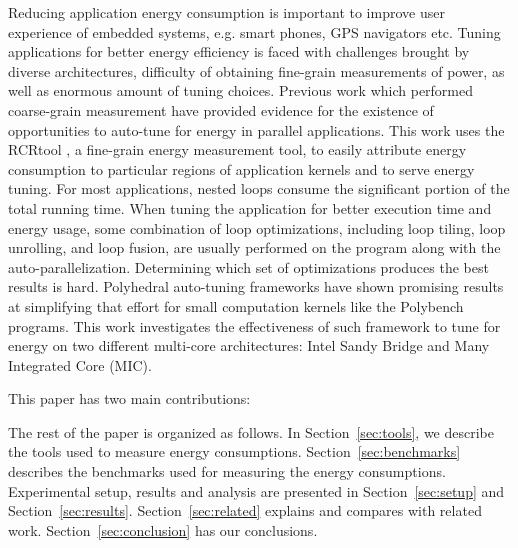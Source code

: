 Reducing application energy consumption is important to improve user experience of 
embedded systems, e.g. smart phones, GPS navigators etc. 
Tuning applications for better energy efficiency is faced with challenges brought by
diverse architectures, difficulty of obtaining fine-grain measurements of power, 
as well as enormous amount of tuning choices.
Previous work which performed coarse-grain measurement have provided evidence for the 
existence of opportunities to auto-tune for energy in parallel applications\cite{Tiwari:EnergyAutoTune}.
This work uses the RCRtool \cite{us}, a fine-grain energy measurement tool, to easily attribute energy consumption to particular
regions of application kernels and to serve energy tuning. For most applications, nested loops consume the significant 
portion of the total running time. When tuning the application for
better execution time and energy usage, some combination of loop optimizations, including loop 
tiling, loop unrolling, and loop fusion, are usually performed on the 
program along with the auto-parallelization.
Determining which set of optimizations produces the best results is hard.
Polyhedral auto-tuning frameworks have shown promising results at simplifying that effort\cite{EJ2012}
for small computation kernels like the Polybench programs. 
This work investigates the effectiveness of such framework to tune for 
energy on two different multi-core architectures: Intel Sandy Bridge
and Many Integrated Core (MIC).
 
This paper has two main contributions:  

The rest of the paper is organized as follows. In Section~\ref{sec:tools}, we describe the tools
used to measure energy consumptions. Section~\ref{sec:benchmarks} describes the benchmarks used for  
measuring the energy consumptions. Experimental setup, results and analysis are presented in Section~\ref{sec:setup} and Section~\ref{sec:results}. 
Section~\ref{sec:related} explains and compares with related work. Section~\ref{sec:conclusion} has 
our conclusions.


